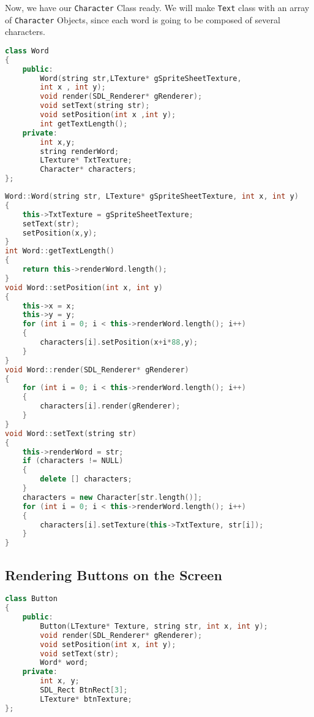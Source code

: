 \documentclass[11pt,fleqn]{book} %
\begin{document}
Now, we have our \texttt{Character} Class ready. We will make \texttt{Text} class with an array of \texttt{Character} Objects, since each word is going to be composed of several characters.

\begin{lstlisting}[language=C++, caption={Use of Array of Pointers and Destructors}]
class Word
{
    public:
        Word(string str,LTexture* gSpriteSheetTexture,
		int x , int y);
        void render(SDL_Renderer* gRenderer);
        void setText(string str);
        void setPosition(int x ,int y);
        int getTextLength();
    private:
        int x,y;
        string renderWord;
        LTexture* TxtTexture;
        Character* characters;
};
\end{lstlisting}

\begin{lstlisting}[language=C++, caption={Use of Array of Pointers and Destructors}]
Word::Word(string str, LTexture* gSpriteSheetTexture, int x, int y)
{
    this->TxtTexture = gSpriteSheetTexture;
    setText(str);
    setPosition(x,y);
}
int Word::getTextLength()
{
    return this->renderWord.length();
}
void Word::setPosition(int x, int y)
{
    this->x = x;
    this->y = y;
    for (int i = 0; i < this->renderWord.length(); i++)
    {
        characters[i].setPosition(x+i*88,y);
    }
}
void Word::render(SDL_Renderer* gRenderer)
{
    for (int i = 0; i < this->renderWord.length(); i++)
    {
        characters[i].render(gRenderer);
    }
}
void Word::setText(string str)
{
    this->renderWord = str;
    if (characters != NULL)
    {
        delete [] characters;
    }
    characters = new Character[str.length()];
    for (int i = 0; i < this->renderWord.length(); i++)
    {
        characters[i].setTexture(this->TxtTexture, str[i]);
    }
}
\end{lstlisting}

\subsection{Rendering Buttons on the Screen}

\begin{lstlisting}[language=C++, caption={Use of Array of Pointers and Destructors}]
class Button
{
    public:
        Button(LTexture* Texture, string str, int x, int y);
        void render(SDL_Renderer* gRenderer);
        void setPosition(int x, int y);
		void setText(str);
        Word* word;
    private:
        int x, y;
        SDL_Rect BtnRect[3];
        LTexture* btnTexture;
};
\end{lstlisting}
\end{document}
